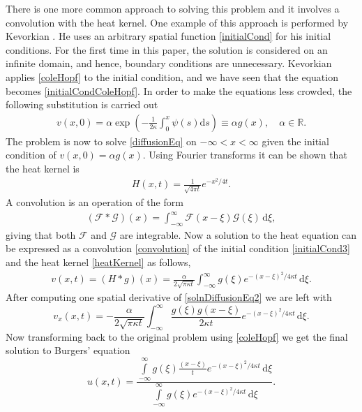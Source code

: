 \documentclass[undefended]{sfuthesis}
\begin{document}
There is one more common approach to solving this problem and it involves a convolution with the heat kernel. One example of this approach is performed by Kevorkian \cite{solution}. He uses an arbitrary spatial function \eqref{initialCond} for his initial conditions. For the first time in this paper, the solution is considered on an infinite domain, and hence, boundary conditions are unnecessary. Kevorkian applies \eqref{coleHopf} to the initial condition, and we have seen that the equation becomes \eqref{initialCondColeHopf}. In order to make the equations less crowded, the following substitution is carried out
\begin{align}
v(x, 0) = \alpha \exp \left(- \frac{1}{2 \kappa} \int_{0}^{x} \psi(s) \mathrm{d} s \right) \equiv \alpha g(x), \quad \alpha \in \mathbb{R}. \label{initialCond3}
\end{align}
The problem is now to solve \eqref{diffusionEq} on $- \infty < x < \infty$ given the initial condition of $v(x, 0) = \alpha g(x).$ Using Fourier transforms it can be shown that the heat kernel is 
\begin{align}
H(x, t) = \frac{1}{\sqrt{4 \pi t}}e^{- x^2/4t}. \label{heatKernel}
\end{align}
A convolution is an operation of the form 
\begin{align}
(\mathcal{F} * \mathcal{G})(x) = \int_{- \infty}^{\infty} \mathcal{F}(x - \xi) \mathcal{G}(\xi) \,\mathrm{d} \xi, \label{convolution}
\end{align}
giving that both $\mathcal{F}$ and $\mathcal{G}$ are integrable. Now a solution to the heat equation can be expressed as a convolution \eqref{convolution} of the initial condition \eqref{initialCond3} and the heat kernel \eqref{heatKernel} as follows,
\begin{align}
v(x, t) = (H * g)(x) = \frac{\alpha}{2\sqrt{\pi \kappa t}} \int_{-\infty}^{\infty} g(\xi) e^{-(x - \xi)^2/4\kappa t} \,\mathrm{d} \xi. \label{solnDiffusionEq2}
\end{align}
After computing one spatial derivative of \eqref{solnDiffusionEq2} we are left with \[v_x(x, t) = - \frac{\alpha}{2\sqrt{\pi \kappa t}} \int_{-\infty}^{\infty} \frac{g(\xi) g(x - \xi)}{2 \kappa t} e^{-(x - \xi)^2/4\kappa t} \,\mathrm{d} \xi.\] Now transforming back to the original problem using \eqref{coleHopf} we get the final solution to Burgers' equation \[u(x, t) = \frac{\int\limits_{- \infty}^{\infty} g(\xi) \frac{\left(x - \xi\right)}{t} e^{-(x - \xi)^2/4 \kappa t} \,\mathrm{d} \xi}{\int\limits_{- \infty}^{\infty} g(\xi) e^{-(x - \xi)^2 / 4 \kappa t} \,\mathrm{d} \xi}.\]
\end{document}
